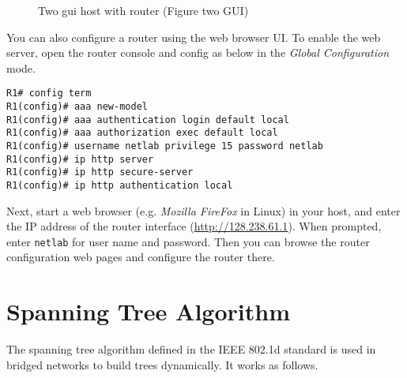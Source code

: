 \documentclass{../UTNetLab}
\begin{document}
\begin{figure}[H]
    \centering
    \caption{Two gui host with router (Figure two GUI)}
    \label{fig:two-gui}
\end{figure}

You can also configure a router using the web browser UI.
To enable the web server, open the router console and config as below  in the \textit{Global Configuration} mode.

\begin{lstlisting}[language={cisco},emph={netlab}]
R1# config term
R1(config)# aaa new-model
R1(config)# aaa authentication login default local
R1(config)# aaa authorization exec default local
R1(config)# username netlab privilege 15 password netlab
R1(config)# ip http server
R1(config)# ip http secure-server
R1(config)# ip http authentication local
    \end{lstlisting}

Next, start a web browser (e.g. \textit{Mozilla FireFox} in Linux) in your host, and enter the IP address of the router interface (\url{http://128.238.61.1}).
When prompted, enter \texttt{netlab} for user name and password.
Then you can browse the router configuration web pages and configure the router there.


\newpage
\appendix

\section{Spanning Tree Algorithm}
\label{appendix:spanningTree}
The spanning tree algorithm defined in the IEEE 802.1d standard is used in bridged networks to build trees dynamically.
It works as follows.
\end{document}
